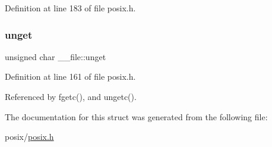 Definition at line 183 of file posix.\+h.

\mbox{\label{struct____file_a1d139ae3cb11a1fada469a49f7d3d3b6}} 
\subsubsection{\texorpdfstring{unget}{unget}}
{\footnotesize\ttfamily unsigned char \+\_\+\+\_\+file\+::unget}



Definition at line 161 of file posix.\+h.



Referenced by fgetc(), and ungetc().



The documentation for this struct was generated from the following file\+:\begin{DoxyCompactItemize}
\item 
posix/\hyperlink{posix_8h}{posix.\+h}\end{DoxyCompactItemize}
